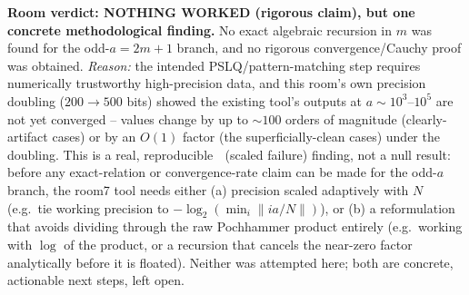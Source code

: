 \textbf{Room verdict: NOTHING WORKED (rigorous claim), but one concrete methodological finding.}
No exact algebraic recursion in $m$ was found for the odd-$a=2m+1$ branch, and no rigorous
convergence/Cauchy proof was obtained. \emph{Reason:} the intended PSLQ/pattern-matching step
requires numerically trustworthy high-precision data, and this room's own precision doubling
($200\to500$ bits) showed the existing tool's outputs at $a\sim10^3$--$10^5$ are not yet converged
-- values change by up to $\sim100$ orders of magnitude (clearly-artifact cases) or by an $O(1)$
factor (the superficially-clean cases) under the doubling. This is a real, reproducible
🌊 (scaled failure) finding, not a null result: before any exact-relation or convergence-rate claim
can be made for the odd-$a$ branch, the room7 tool needs either (a) precision scaled adaptively
with $N$ (e.g.\ tie working precision to $-\log_2(\min_i\|ia/N\|)$), or (b) a reformulation that
avoids dividing through the raw Pochhammer product entirely (e.g.\ working with $\log$ of the
product, or a recursion that cancels the near-zero factor analytically before it is floated).
Neither was attempted here; both are concrete, actionable next steps, left open.
